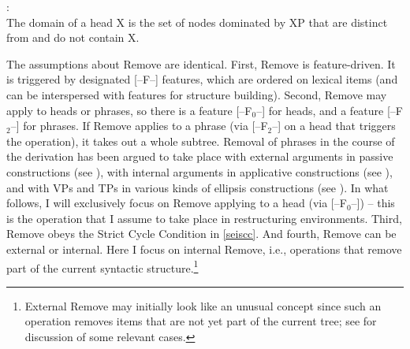 \documentclass[output=paper]{langsci/langscibook}
\begin{document}
 \parencite{Chomsky:95}:\\ The domain of a head X
is the set of nodes dominated by XP that are distinct from and do not contain
X.
\z

The assumptions about Remove are identical. First, Remove is feature-driven.
It is triggered by designated [--F--] features, which are ordered on lexical
items (and can be interspersed with features for structure building). Second,
Remove may apply to heads or phrases, so there is a feature [--F$_0$--] for
heads, and a feature [--F$_2$--] for phrases. If Remove applies to a phrase
(via [--F$_2$--] on a head that triggers the operation), it takes out a whole
subtree.  Removal of phrases in the course of the derivation has been argued to
take place with external arguments in  passive constructions (see
\citealt{Mueller:16:sho}), with internal arguments in applicative constructions
(see \citealt{Mueller:17:fdm}), and with VPs and TPs in various kinds of
ellipsis constructions  (see \citealt{Murphy:15,Murphy&Mueller:16}). In what
follows, I will exclusively focus on Remove applying to a head (via
[--F$_0$--]) -- this is the operation that I assume to take place in
restructuring environments.  Third, Remove obeys the Strict Cycle Condition in
\eqref{seiscc}. And fourth, Remove can be external or internal. Here I focus on
internal Remove, i.e., operations that remove part of the current syntactic
structure.\footnote{External Remove may initially look like an unusual concept
    since such an operation removes items that are not yet part of the current
tree; see \cite{Mueller:16:sho,Mueller:17:fdm} for discussion of some relevant
cases.}
\end{document}
